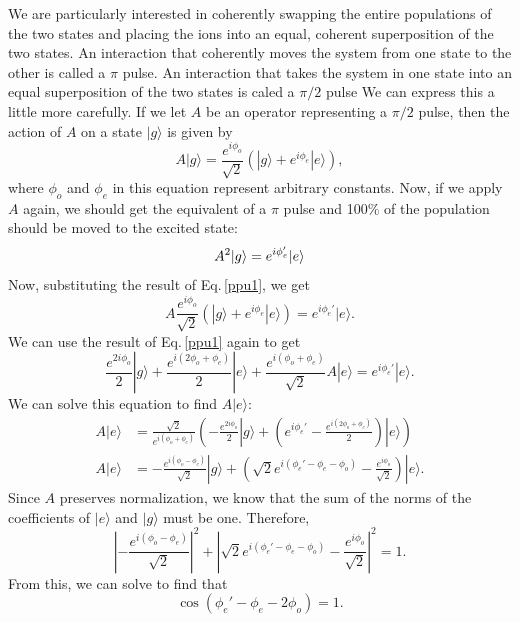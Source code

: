 We are particularly interested in coherently swapping the entire populations of the two states and placing the ions into an equal, coherent superposition of the two states.
An interaction that coherently moves the system from one state to the other is called a $\pi$ pulse. An interaction that takes the system in one state into an equal superposition of the two states is caled a $\pi/2$ pulse 
We can express this a little more carefully. If we let $A$ be an operator representing a $\pi/2$ pulse, then the action of $A$ on a state $|g\rangle$ is given by 
\begin{equation} \label{ppu1}
A|g\rangle = \frac{e^{i\phi_o}}{\sqrt{2}} \left(|g\rangle + e^{i\phi_e}|e\rangle\right),
\end{equation}
where $\phi_o$ and $\phi_e$ in this equation represent arbitrary constants.
Now, if we apply $A$ again, we should get the equivalent of a $\pi$ pulse and 100\% of the population should be moved to the excited state: 
\begin{equation}
A^2|g\rangle = e^{i\phi_e'}|e\rangle\\
\end{equation}
Now, substituting the result of Eq.\,\eqref{ppu1}, we get
\begin{equation}
A\frac{e^{i\phi_o}}{\sqrt{2}} \left(|g\rangle + e^{i\phi_e}|e\rangle\right)=e^{i\phi_e'}|e\rangle.
\end{equation}
We can use the result of Eq.\,\eqref{ppu1} again to get 
\begin{equation}
\frac{e^{2i\phi_o}}{2}
|g\rangle
+
\frac{e^{i(2\phi_o+\phi_e)}}{2} |e\rangle
+
\frac{e^{i(\phi_o+\phi_e)}}{\sqrt{2}}
A|e\rangle
=e^{i\phi_e'}|e\rangle.
\end{equation}
We can solve this equation to find $A|e\rangle$: 
\begin{align}
A|e\rangle&= 
\frac{\sqrt{2}}{e^{i(\phi_o+\phi_e)}}
\left(
-\frac{e^{2i\phi_o}}{2}|g\rangle
+\left(e^{i\phi_e'}-\frac{e^{i(2\phi_o+\phi_e)}}{2}\right) |e\rangle
\right)\\
A|e\rangle&= 
-\frac{e^{i(\phi_o-\phi_e)}}{\sqrt{2}}|g\rangle
+\left(\sqrt{2}e^{i(\phi_e'-\phi_e-\phi_o)}-\frac{e^{i\phi_o}}{\sqrt{2}}\right) |e\rangle.
\end{align}
Since $A$ preserves normalization, we know that the sum of the norms of the coefficients of $|e\rangle$ and $|g\rangle$ must be one. Therefore, 
\begin{equation}
\left|-\frac{e^{i(\phi_o-\phi_e)}}{\sqrt{2}}\right|^2 + \left|\sqrt{2}e^{i(\phi_e'-\phi_e-\phi_o)}-\frac{e^{i\phi_o}}{\sqrt{2}}\right|^2 = 1.
\end{equation}
From this, we can solve to find that  
\begin{equation}
\cos\left(\phi_e'-\phi_e-2\phi_o\right) = 1.
\end{equation}

